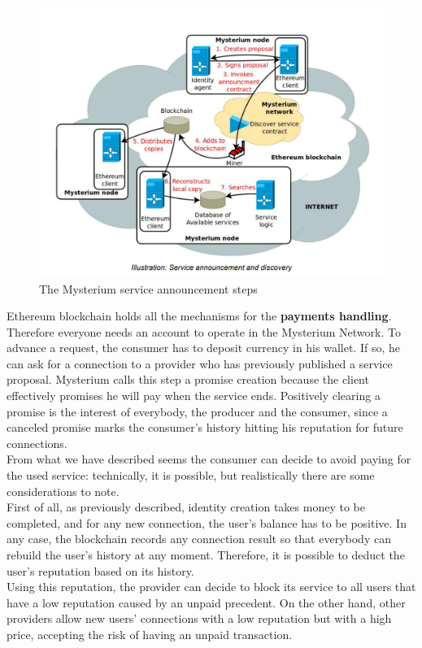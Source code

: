 \documentclass[]{article}
\begin{document}
	\begin{figure}
		\includegraphics[width=0.5\linewidth]{"images/mysterium_service_announcement.png"}
		\caption{The Mysterium service announcement steps}
	\end{figure}
	
	Ethereum blockchain holds all the mechanisms for the \textbf{payments handling}. Therefore everyone needs an account to operate in the Mysterium Network. To advance a request, the consumer has to deposit currency in his wallet. If so, he can ask for a connection to a provider who has previously published a service proposal. Mysterium calls this step a promise creation because the client effectively promises he will pay when the service ends. Positively clearing a promise is the interest of everybody, the producer and the consumer, since a canceled promise marks the consumer's history hitting his reputation for future connections.\\
	From what we have described seems the consumer can decide to avoid paying for the used service: technically, it is possible, but realistically there are some considerations to note.\\
	First of all, as previously described, identity creation takes money to be completed, and for any new connection, the user's balance has to be positive. In any case, the blockchain records any connection result so that everybody can rebuild the user's history at any moment. Therefore, it is possible to deduct the user's reputation based on its history.\\
	Using this reputation, the provider can decide to block its service to all users that have a low reputation caused by an unpaid precedent. On the other hand, other providers allow new users' connections with a low reputation but with a high price, accepting the risk of having an unpaid transaction.\\
	
\end{document}
